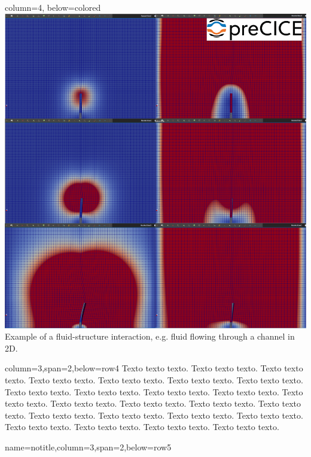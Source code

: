 \documentclass[
	paper=a0,
	style=ruled, %
	]{bfhsciposter}
\begin{document}
\begin{tcbposter}[
		poster={
				columns=4,
				rows=7,
				spacing=1cm,
			},]
	\begin{posterboxenv}{column=4, below=colored}
		\includegraphics[width=\linewidth]{sequence}
		Example of a fluid-structure interaction, e.g. fluid flowing through a channel in 2D.
	\end{posterboxenv}

	\begin{posterboxenv}[BFH-framed,title=Images]{column=3,span=2,below=row4}
		Texto texto texto. Texto texto texto. Texto texto texto. Texto texto texto. Texto texto texto. Texto texto texto.
		Texto texto texto. Texto texto texto. Texto texto texto. Texto texto texto. Texto texto texto. Texto texto texto.
		Texto texto texto. Texto texto texto. Texto texto texto. Texto texto texto. Texto texto texto. Texto texto texto.
		Texto texto texto. Texto texto texto. Texto texto texto. Texto texto texto. Texto texto texto. Texto texto texto.
	\end{posterboxenv}

	\begin{posterboxenv}{name=notitle,column=3,span=2,below=row5}
		\nocite{*}
		
	\end{posterboxenv}

\end{tcbposter}
\end{document}
